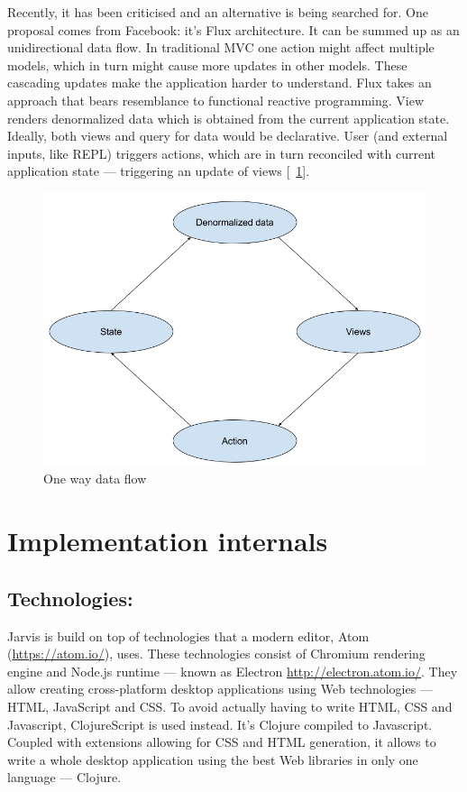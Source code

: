 \documentclass[11pt]{scrartcl}
\newcommand*{\figref}[1]{[\textbf{\figurename}~\ref{#1}]}
\begin{document}
Recently, it has been criticised and an alternative is being searched for.
One proposal comes from Facebook: it’s Flux architecture.
It can be summed up as an unidirectional data flow.
In traditional MVC one action might affect multiple models, which in turn might
cause more updates in other models.
These cascading updates make the application harder to understand.
Flux takes an approach that bears resemblance to functional reactive
programming.
View renders denormalized data which is obtained from the current application
state.
Ideally, both views and query for data would be declarative.
User (and external inputs, like REPL) triggers actions, which are in turn
reconciled with current application state --- triggering an update of views
\figref{fig:oneway}.

\begin{figure}[hbt]
  \centering
  \includegraphics[scale=0.3]{img/OneWay}
  \caption{One way data flow}
\label{fig:oneway}
\end{figure}

\section{Implementation internals}
\subsection{Technologies:}
Jarvis is build on top of technologies that a modern editor, Atom
(\url{https://atom.io/}), uses.
These technologies consist of Chromium rendering engine and Node.js runtime ---
known as Electron \url{http://electron.atom.io/}.
They allow creating cross-platform desktop applications using Web technologies ---
HTML, JavaScript and CSS.
To avoid actually having to write HTML, CSS and Javascript, ClojureScript is
used instead.
It’s Clojure compiled to Javascript.
Coupled with extensions allowing for CSS and HTML generation, it allows to write
a whole desktop application using the best Web libraries in only one language ---
Clojure.
\end{document}
